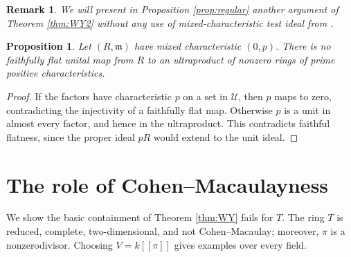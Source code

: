 \documentclass[11pt,a4paper]{amsart}
\numberwithin{equation}{section}
\newtheorem{proposition}[theorem]{Proposition}
\newtheorem{remark}[theorem]{Remark}
\newcommand{\U}{\mathcal{U}}
\newcommand{\mm}{\mathfrak m}
\begin{document}
 \begin{remark}
 We will present in Proposition 
 \ref{prop:regular}  another argument of {Theorem} \ref{thm:WY2}  without any use of mixed-characteristic
 	test ideal from \cite{BMP}.
 
 \end{remark}
 

 
 \begin{proposition}\label{prop:no-lefschetz}
 	Let $(R,\mm)$ have mixed characteristic $(0,p)$. There is no
 	faithfully flat unital map from $R$ to an ultraproduct of nonzero
 	rings of prime positive characteristics.
 \end{proposition}
 
 \begin{proof}
 	If the factors have characteristic $p$ on a set in $\U$, then
 	$p$ maps to zero, contradicting the injectivity of a faithfully
 	flat map. Otherwise $p$ is a unit in almost every factor, and
 	hence in the ultraproduct. This contradicts faithful flatness,
 	since the proper ideal $pR$ would extend to the unit ideal.
 \end{proof}
 


 
 
 \section{The role of Cohen--Macaulayness}
 
 We show   the basic containment of Theorem \ref{thm:WY} fails for $T$.
 The ring $T$ is reduced, complete, two-dimensional, and
 not Cohen--Macaulay; moreover, $\pi$ is a nonzerodivisor.
 Choosing $V=k[[\pi]]$ gives examples over every field.
 
\end{document}
